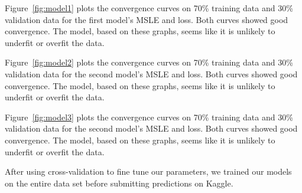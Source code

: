 \documentclass[11pt]{article}
\numberwithin{equation}{section}
\begin{document}
Figure~\ref{fig:model1} plots the convergence curves on 70\% training data and 30\% validation data for the first model's MSLE and loss. Both curves showed good convergence. The model, based on these graphs, seems like it is unlikely to underfit or overfit the data. 

Figure~\ref{fig:model2} plots the convergence curves on 70\% training data and 30\% validation data for the second model's MSLE and loss. Both curves showed good convergence. The model, based on these graphs, seems like it is unlikely to underfit or overfit the data. 

Figure~\ref{fig:model3} plots the convergence curves on 70\% training data and 30\% validation data for the second model's MSLE and loss. Both curves showed good convergence. The model, based on these graphs, seems like it is unlikely to underfit or overfit the data. 

After using cross-validation to fine tune our parameters, we trained our models on the entire data set before submitting predictions on Kaggle. 
\end{document}
